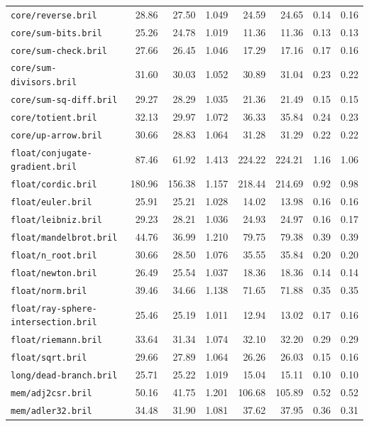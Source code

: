 \begin{longtable}{p{48mm}rrrrrrr}
\nolinkurl{core/reverse.bril} & 28.86 & 27.50 & 1.049 & 24.59 & 24.65 & 0.14 & 0.16 \\
\nolinkurl{core/sum-bits.bril} & 25.26 & 24.78 & 1.019 & 11.36 & 11.36 & 0.13 & 0.13 \\
\nolinkurl{core/sum-check.bril} & 27.66 & 26.45 & 1.046 & 17.29 & 17.16 & 0.17 & 0.16 \\
\nolinkurl{core/sum-divisors.bril} & 31.60 & 30.03 & 1.052 & 30.89 & 31.04 & 0.23 & 0.22 \\
\nolinkurl{core/sum-sq-diff.bril} & 29.27 & 28.29 & 1.035 & 21.36 & 21.49 & 0.15 & 0.15 \\
\nolinkurl{core/totient.bril} & 32.13 & 29.97 & 1.072 & 36.33 & 35.84 & 0.24 & 0.23 \\
\nolinkurl{core/up-arrow.bril} & 30.66 & 28.83 & 1.064 & 31.28 & 31.29 & 0.22 & 0.22 \\
\nolinkurl{float/conjugate-gradient.bril} & 87.46 & 61.92 & 1.413 & 224.22 & 224.21 & 1.16 & 1.06 \\
\nolinkurl{float/cordic.bril} & 180.96 & 156.38 & 1.157 & 218.44 & 214.69 & 0.92 & 0.98 \\
\nolinkurl{float/euler.bril} & 25.91 & 25.21 & 1.028 & 14.02 & 13.98 & 0.16 & 0.16 \\
\nolinkurl{float/leibniz.bril} & 29.23 & 28.21 & 1.036 & 24.93 & 24.97 & 0.16 & 0.17 \\
\nolinkurl{float/mandelbrot.bril} & 44.76 & 36.99 & 1.210 & 79.75 & 79.38 & 0.39 & 0.39 \\
\nolinkurl{float/n_root.bril} & 30.66 & 28.50 & 1.076 & 35.55 & 35.84 & 0.20 & 0.20 \\
\nolinkurl{float/newton.bril} & 26.49 & 25.54 & 1.037 & 18.36 & 18.36 & 0.14 & 0.14 \\
\nolinkurl{float/norm.bril} & 39.46 & 34.66 & 1.138 & 71.65 & 71.88 & 0.35 & 0.35 \\
\nolinkurl{float/ray-sphere-intersection.bril} & 25.46 & 25.19 & 1.011 & 12.94 & 13.02 & 0.17 & 0.16 \\
\nolinkurl{float/riemann.bril} & 33.64 & 31.34 & 1.074 & 32.10 & 32.20 & 0.29 & 0.29 \\
\nolinkurl{float/sqrt.bril} & 29.66 & 27.89 & 1.064 & 26.26 & 26.03 & 0.15 & 0.16 \\
\nolinkurl{long/dead-branch.bril} & 25.71 & 25.22 & 1.019 & 15.04 & 15.11 & 0.10 & 0.10 \\
\nolinkurl{mem/adj2csr.bril} & 50.16 & 41.75 & 1.201 & 106.68 & 105.89 & 0.52 & 0.52 \\
\nolinkurl{mem/adler32.bril} & 34.48 & 31.90 & 1.081 & 37.62 & 37.95 & 0.36 & 0.31 \\

\end{longtable}
